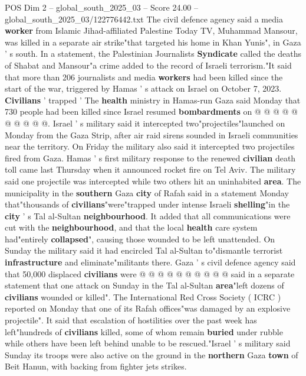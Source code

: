\begin{textsample}{POS Dim 2 – global\_south\_2025\_03 – Score 24.00 – global\_south\_2025\_03/122776442.txt}
The civil defence agency said a media \textbf{worker} from Islamic Jihad-affiliated Palestine Today TV, Muhammad Mansour, was killed in a separate air strike"that targeted his home in Khan Yunis", in Gaza ' s south.
In a statement, the Palestinian Journalists \textbf{Syndicate} called the deaths of Shabat and Mansour"a crime added to the record of Israeli terrorism."It said that more than 206 journalists and media \textbf{workers} had been killed since the start of the war, triggered by Hamas ' s attack on Israel on October 7, 2023. \textbf{Civilians} ' trapped ' The \textbf{health} ministry in Hamas-run Gaza said Monday that 730 people had been killed since Israel resumed \textbf{bombardments} on @ @ @ @ @ @ @ @ @ @.
Israel ' s military said it intercepted two"projectiles"launched on Monday from the Gaza Strip, after air raid sirens sounded in Israeli communities near the territory.
On Friday the military also said it intercepted two projectiles fired from Gaza.
Hamas ' s first military response to the renewed \textbf{civilian} death toll came last Thursday when it announced rocket fire on Tel Aviv.
The military said one projectile was intercepted while two others hit an uninhabited \textbf{area}.
The municipality in the \textbf{southern} Gaza \textbf{city} of Rafah said in a statement Monday that"thousands of \textbf{civilians}"were"trapped under intense Israeli \textbf{shelling}"in the \textbf{city} ' s Tal al-Sultan \textbf{neighbourhood}.
It added that all communications were cut with the \textbf{neighbourhood}, and that the local \textbf{health} care system had"entirely \textbf{collapsed}", causing those wounded to be left unattended.
On Sunday the military said it had encircled Tal al-Sultan to"dismantle terrorist \textbf{infrastructure} and eliminate"militants there.
Gaza ' s civil defence agency said that 50,000 displaced \textbf{civilians} were @ @ @ @ @ @ @ @ @ @ said in a separate statement that one attack on Sunday in the Tal al-Sultan \textbf{area}"left dozens of \textbf{civilians} wounded or killed".
The International Red Cross Society ( ICRC ) reported on Monday that one of its Rafah offices"was damaged by an explosive projectile".
It said that escalation of hostilities over the past week has left"hundreds of \textbf{civilians} killed, some of whom remain \textbf{buried} under rubble while others have been left behind unable to be rescued."Israel ' s military said Sunday its troops were also active on the ground in the \textbf{northern} Gaza \textbf{town} of Beit Hanun, with backing from fighter jets strikes.

\end{textsample}
